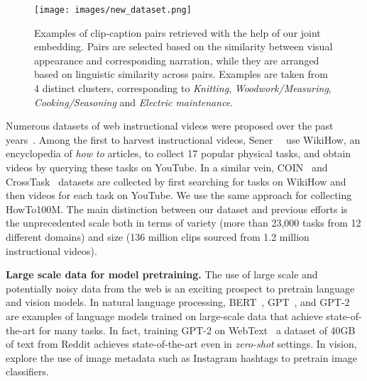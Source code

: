 \documentclass[10pt,twocolumn,letterpaper]{article}
\begin{document}
\begin{figure*}[t]
\centering
\texttt{[image: images/new\_dataset.png]}
\vspace{-8mm}
\caption{\small Examples of clip-caption pairs retrieved with the help of our joint embedding. Pairs are selected based on the similarity between visual appearance and corresponding narration, while they are arranged based on linguistic similarity across pairs. Examples are taken from 4 distinct clusters, corresponding to \textit{Knitting}, \textit{Woodwork/Measuring}, \textit{Cooking/Seasoning} and \textit{Electric maintenance}.}
\vspace{-3mm}
\label{fig:pair-examples}
\end{figure*}


Numerous datasets of web instructional videos were proposed over the past years~\cite{alayrac16unsupervised,malmaud15what,
sanabria18how2,Sener_2015_ICCV,
tang2019coin,youcook2,zhukov2019crosstask}.
Among the first to harvest instructional videos, Sener~\etal~\cite{Sener_2015_ICCV} use WikiHow, an encyclopedia of \emph{how to} articles, to collect 17 popular physical tasks, and obtain videos by querying these tasks on YouTube.
In a similar vein, COIN~\cite{tang2019coin} and CrossTask~\cite{zhukov2019crosstask} datasets are collected by first searching for tasks on WikiHow and then videos for each task on YouTube.
We use the same approach for collecting HowTo100M.
The main distinction between our dataset and previous efforts is the unprecedented scale both in terms of variety (more than 23,000 tasks from 12 different domains) and size (136 million clips sourced from 1.2 million instructional videos).












\vspace{1mm}
\noindent
\textbf{Large scale data for model pretraining.}
The use of large scale and potentially noisy data from the web is an exciting prospect to pretrain language and vision models.
In natural language processing, BERT~\cite{bert18}, GPT~\cite{gpt18openai}, and GPT-2~\cite{radford19LM} are examples of language models trained on large-scale data that achieve state-of-the-art for many tasks.
In fact, training GPT-2 on WebText~\cite{radford19LM} a dataset of 40GB of text from Reddit achieves state-of-the-art even in \emph{zero-shot} settings.
In vision, \cite{limitsWeakly18mahajan,sun17JFT} explore the use of image metadata such as Instagram hashtags to pretrain image classifiers.
\end{document}
